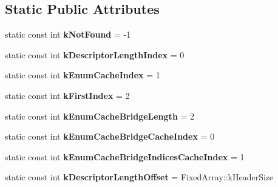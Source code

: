 \subsection*{Static Public Attributes}
\begin{DoxyCompactItemize}
\item 
static const int {\bfseries k\+Not\+Found} = -\/1\hypertarget{classv8_1_1internal_1_1_descriptor_array_a616314d46969c56bb8a8586f97173624}{}\label{classv8_1_1internal_1_1_descriptor_array_a616314d46969c56bb8a8586f97173624}

\item 
static const int {\bfseries k\+Descriptor\+Length\+Index} = 0\hypertarget{classv8_1_1internal_1_1_descriptor_array_afd2a103ec4261706423457393dcce941}{}\label{classv8_1_1internal_1_1_descriptor_array_afd2a103ec4261706423457393dcce941}

\item 
static const int {\bfseries k\+Enum\+Cache\+Index} = 1\hypertarget{classv8_1_1internal_1_1_descriptor_array_a5cf9108a849b7b726bfb37eed4db2f75}{}\label{classv8_1_1internal_1_1_descriptor_array_a5cf9108a849b7b726bfb37eed4db2f75}

\item 
static const int {\bfseries k\+First\+Index} = 2\hypertarget{classv8_1_1internal_1_1_descriptor_array_ade15110ea3f85740688adf93973e6fe0}{}\label{classv8_1_1internal_1_1_descriptor_array_ade15110ea3f85740688adf93973e6fe0}

\item 
static const int {\bfseries k\+Enum\+Cache\+Bridge\+Length} = 2\hypertarget{classv8_1_1internal_1_1_descriptor_array_ac6ec69727df78fd0383c2868996298eb}{}\label{classv8_1_1internal_1_1_descriptor_array_ac6ec69727df78fd0383c2868996298eb}

\item 
static const int {\bfseries k\+Enum\+Cache\+Bridge\+Cache\+Index} = 0\hypertarget{classv8_1_1internal_1_1_descriptor_array_a2258b1456fdde910ff2dd05e0c49ac1d}{}\label{classv8_1_1internal_1_1_descriptor_array_a2258b1456fdde910ff2dd05e0c49ac1d}

\item 
static const int {\bfseries k\+Enum\+Cache\+Bridge\+Indices\+Cache\+Index} = 1\hypertarget{classv8_1_1internal_1_1_descriptor_array_a1547950e97d668f894eadc6f4cdbe802}{}\label{classv8_1_1internal_1_1_descriptor_array_a1547950e97d668f894eadc6f4cdbe802}

\item 
static const int {\bfseries k\+Descriptor\+Length\+Offset} = Fixed\+Array\+::k\+Header\+Size\hypertarget{classv8_1_1internal_1_1_descriptor_array_a5e7e4ba18cc797ff4520421e76e38db8}{}\label{classv8_1_1internal_1_1_descriptor_array_a5e7e4ba18cc797ff4520421e76e38db8}


\end{DoxyCompactItemize}
